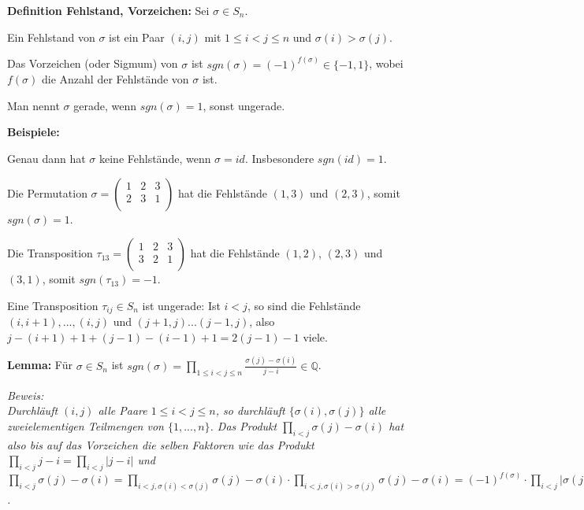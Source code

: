 \documentclass[11pt]{article}
\begin{document}
		\begin{mdframed}[backgroundcolor=blue!20]
			\textbf{Definition Fehlstand, Vorzeichen:} Sei $\sigma\in S_n$.
			\begin{compactitem}
				\item Ein Fehlstand von $\sigma$ ist ein Paar $(i,j)$ mit $1\le i<j\le n$ und $\sigma(i)>\sigma(j)$.
				\item Das Vorzeichen (oder Sigmum) von $\sigma$ ist $sgn(\sigma)=(-1)^{f(\sigma)}\in \{-1,1\}$, wobei $f(\sigma)$ die 
				Anzahl der Fehlstände von $\sigma$ ist.
				\item Man nennt $\sigma$ gerade, wenn $sgn(\sigma)=1$, sonst ungerade.
			\end{compactitem}
		\end{mdframed}
		
		\textbf{Beispiele:}
		\begin{compactitem}
			\item Genau dann hat $\sigma$ keine Fehlstände, wenn $\sigma=id$. Insbesondere $sgn(id)=1$.
			\item Die Permutation $\sigma=\begin{pmatrix}1 & 2 & 3\\2 & 3 & 1\\\end{pmatrix}$ hat die Fehlstände $(1,3)$ und $(2,3)$, somit 
			$sgn(\sigma)=1$.
			\item Die Transposition $\tau_{13}=\begin{pmatrix}1 & 2 & 3\\3 & 2 & 1\\\end{pmatrix}$ hat die Fehlstände $(1,2)$, $(2,3)$ und 
			$(3,1)$, somit $sgn(\tau_{13})=-1$.
			\item Eine Transposition $\tau_{ij}\in S_n$ ist ungerade: Ist $i<j$, so sind die Fehlstände $(i,i+1),...,(i,j)$ und $(j+1,j)...
			(j-1,j)$, also $j-(i+1)+1+(j-1)-(i-1)+1=2(j-1)-1$ viele.
		\end{compactitem}
		
		\begin{framed}
			\textbf{Lemma:} Für $\sigma\in S_n$ ist $sgn(\sigma)=\prod\limits_{1\le i<j\le n} \frac{\sigma(j)-\sigma(i)}{j-i}\in \mathbb Q$.
		\end{framed}
		\textit{Beweis: \\
		Durchläuft $(i,j)$ alle Paare $1\le i<j\le n$, so durchläuft $\{\sigma(i),\sigma(j)\}$ alle zweielementigen Teilmengen von $\{1,...,
		n\}$. Das Produkt $\prod\limits_{i<j} \sigma(j)-\sigma(i)$ hat also bis auf das Vorzeichen die selben Faktoren wie das Produkt 
		$\prod\limits_{i<j} j-i=\prod\limits_{i<j} |j-i|$ und $\prod\limits_{i<j} \sigma(j)-\sigma(i)=\prod\limits_{i<j,\sigma(i)<\sigma(j)} 
		\sigma(j)-\sigma(i) \cdot \prod\limits_{i<j,\sigma(i)>\sigma(j)} \sigma(j)-\sigma(i)=(-1)^{f(\sigma)}\cdot \prod\limits_{i<j} 
		|\sigma(j)-\sigma(i)|=sgn(\sigma)\cdot \prod\limits_{i<j} j-i$.}
		
\end{document}
